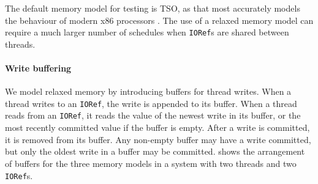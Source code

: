 The default memory model for testing is TSO, as that most accurately
models the behaviour of modern x86 processors \parencite{owens2009}.  The
use of a relaxed memory model can require a much larger number of
schedules when \verb|IORef|s are shared between threads.

\paragraph{Write buffering}
We model relaxed memory by introducing buffers for thread writes.  When a thread
writes to an \verb|IORef|, the write is appended to its buffer.  When a thread
reads from an \verb|IORef|, it reads the value of the newest write in its buffer,
or the most recently committed value if the buffer is empty.  After a write is
committed, it is removed from its buffer.  Any non-empty buffer may have a write
committed, but only the oldest write in a buffer may be committed.  
shows the arrangement of buffers for the three memory models in a system with
two threads and two \verb|IORef|s.

